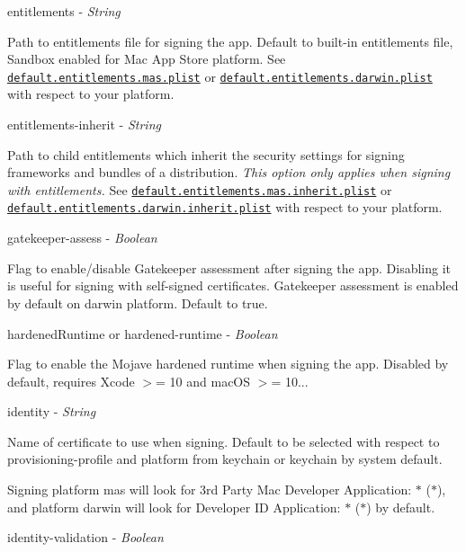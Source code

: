 {\ttfamily entitlements} -\/ {\itshape String}

Path to entitlements file for signing the app. Default to built-\/in entitlements file, Sandbox enabled for Mac App Store platform. See \href{https://github.com/electron-userland/electron-osx-sign/blob/master/default.entitlements.mas.plist}{\tt default.\+entitlements.\+mas.\+plist} or \href{https://github.com/electron-userland/electron-osx-sign/blob/master/default.entitlements.darwin.plist}{\tt default.\+entitlements.\+darwin.\+plist} with respect to your platform.

{\ttfamily entitlements-\/inherit} -\/ {\itshape String}

Path to child entitlements which inherit the security settings for signing frameworks and bundles of a distribution. {\itshape This option only applies when signing with entitlements.} See \href{https://github.com/electron-userland/electron-osx-sign/blob/master/default.entitlements.mas.inherit.plist}{\tt default.\+entitlements.\+mas.\+inherit.\+plist} or \href{https://github.com/electron-userland/electron-osx-sign/blob/master/default.entitlements.darwin.inherit.plist}{\tt default.\+entitlements.\+darwin.\+inherit.\+plist} with respect to your platform.

{\ttfamily gatekeeper-\/assess} -\/ {\itshape Boolean}

Flag to enable/disable Gatekeeper assessment after signing the app. Disabling it is useful for signing with self-\/signed certificates. Gatekeeper assessment is enabled by default on {\ttfamily darwin} platform. Default to {\ttfamily true}.

{\ttfamily hardened\+Runtime} or {\ttfamily hardened-\/runtime} -\/ {\itshape Boolean}

Flag to enable the Mojave hardened runtime when signing the app. Disabled by default, requires Xcode $>$= 10 and mac\+OS $>$= 10...

{\ttfamily identity} -\/ {\itshape String}

Name of certificate to use when signing. Default to be selected with respect to {\ttfamily provisioning-\/profile} and {\ttfamily platform} from {\ttfamily keychain} or keychain by system default.

Signing platform {\ttfamily mas} will look for {\ttfamily 3rd Party Mac Developer Application\+: $\ast$ ($\ast$)}, and platform {\ttfamily darwin} will look for {\ttfamily Developer ID Application\+: $\ast$ ($\ast$)} by default.

{\ttfamily identity-\/validation} -\/ {\itshape Boolean}

